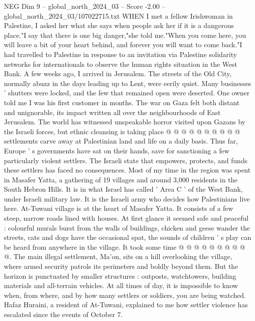 \begin{textsample}{NEG Dim 9 – global\_north\_2024\_03 – Score -2.00 – global\_north\_2024\_03/107022715.txt}  \label{ex:f9_neg_182}
WHEN I met a fellow Irishwoman in Palestine, I asked her what she says when people ask her if it is a dangerous place."I say that there is one big danger,"she told me."When you come here, you will leave a bit of your heart behind, and forever you will want to come back."I had travelled to Palestine in response to an invitation via Palestine solidarity networks for internationals to observe the human rights situation in the West Bank.
A few weeks ago, I arrived in Jerusalem.
The streets of the Old City, normally abuzz in the days leading up to Lent, were eerily quiet.
Many businesses ' shutters were locked, and the few that remained open were deserted.
One owner told me I was his first customer in months.
The war on Gaza felt both distant and unignorable, its impact written all over the neighbourhoods of East Jerusalem.
The world has witnessed unspeakable horror visited upon Gazans by the Israeli forces, but ethnic cleansing is taking place @ @ @ @ @ @ @ @ @ @ settlements carve away at Palestinian land and life on a daily basis.
Thus far, Europe ' s governments have sat on their hands, save for sanctioning a few particularly violent settlers.
The Israeli state that empowers, protects, and funds these settlers has faced no consequences.
Most of my time in the region was spent in Masafer Yatta, a gathering of 19 villages and around 3,000 residents in the South Hebron Hills.
It is in what Israel has called ' Area C ' of the West Bank, under Israeli military law.
It is the Israeli army who decides how Palestinians live here.
At-Tuwani village is at the heart of Masafer Yatta.
It consists of a few steep, narrow roads lined with houses.
At first glance it seemed safe and peaceful : colourful murals burst from the walls of buildings, chicken and geese wander the streets, cats and dogs have the occasional spat, the sounds of children ' s play can be heard from anywhere in the village.
It took some time @ @ @ @ @ @ @ @ @ @.
The main illegal settlement, Ma'on, sits on a hill overlooking the village, where armed security patrols its perimeters and boldly beyond them.
But the horizon is punctuated by smaller structures : outposts, watchtowers, building materials and all-terrain vehicles.
At all times of day, it is impossible to know when, from where, and by how many settlers or soldiers, you are being watched.
Hafaz Huraini, a resident of At-Tuwani, explained to me how settler violence has escalated since the events of October 7.

\end{textsample}
